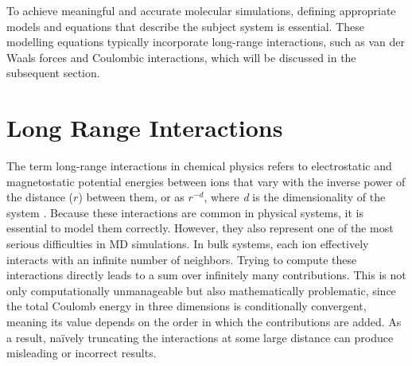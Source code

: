 To achieve meaningful and accurate molecular simulations, defining appropriate models and equations that describe the subject system is essential. These modelling equations typically incorporate long-range interactions, such as van der Waals forces and Coulombic interactions, which will be discussed in the subsequent section.


\section{Long Range Interactions}
The term long-range interactions in chemical physics refers to electrostatic and magnetostatic potential energies between ions that vary with the inverse power of the distance ($r$) between them, or as $r^{-d}$, where \textit{d} is the dimensionality of the system \cite{simulation_of_liq}. Because these interactions are common in physical systems, it is essential to model them correctly. However, they also represent one of the most serious difficulties in \ac{MD} simulations. In bulk systems, each ion effectively interacts with an infinite number of neighbors. Trying to compute these interactions directly leads to a sum over infinitely many contributions. This is not only computationally unmanageable but also mathematically problematic, since the total Coulomb energy in three dimensions is conditionally convergent, meaning its value depends on the order in which the contributions are added. As a result, naïvely truncating the interactions at some large distance can produce misleading or incorrect results.

